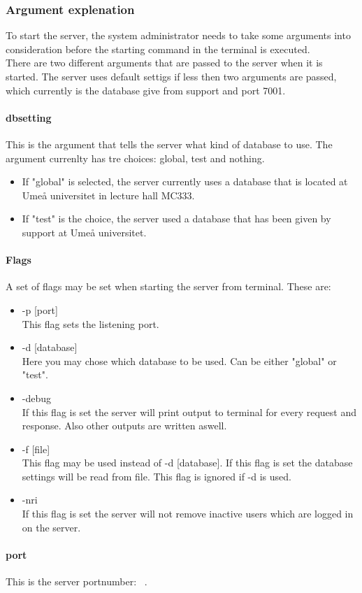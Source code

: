 \subsubsection{Argument explenation}
\label{sec:com_ArgExpl}
To start the server, the system administrator needs to take some arguments into consideration before the starting command in the terminal is executed.\\
There are two different arguments that are passed to the server when it is started.
The server uses default settigs if less then two arguments are passed, which currently is the database give from support and port 7001.

\paragraph{dbsetting}
This is the argument that tells the server what kind of database to use.
The argument currenlty has tre choices: global, test and nothing. 


\begin{itemize}
\item If "global" is selected, the server currently uses a database that is located at Umeå universitet in lecture hall MC333.
\item If "test" is the choice, the server used a database that has been given by support at Umeå universitet. 
\end{itemize}

\paragraph{Flags}
A set of flags may be set when starting the server from terminal. These are:
\begin{itemize}
\item -p [port] \\This flag sets the listening port. 
\item -d [database] \\Here you may chose which database to be used. Can be either "global" or "test".
\item -debug \\If this flag is set the server will print output to terminal for every request and response. Also other outputs are written aswell.
\item -f [file] \\This flag may be used instead of -d [database]. If this flag is set the database settings will be read from file. This flag is ignored if -d is used.
\item -nri \\If this flag is set the server will not remove inactive users which are logged in on the server.
\end{itemize}

\paragraph{port}
This is the server portnumber: \serverPort\ .

